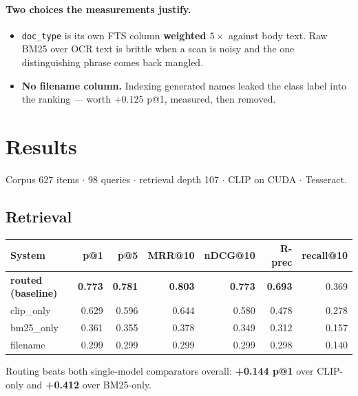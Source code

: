 \documentclass[11pt,a4paper]{article}
\newcommand{\code}[1]{\texttt{\small #1}}
\newcommand{\best}[1]{\textbf{#1}}
\begin{document}
\paragraph{Two choices the measurements justify.}
\begin{itemize}[leftmargin=1.3em,itemsep=0.2em]
  \item \code{doc\_type} is its own FTS column \textbf{weighted $5\times$} against
        body text. Raw BM25 over OCR text is brittle when a scan is noisy and the
        one distinguishing phrase comes back mangled.
  \item \textbf{No filename column.} Indexing generated names leaked the class
        label into the ranking --- worth $+0.125$ p@1, measured, then removed.
\end{itemize}

\section{Results}

Corpus 627 items $\cdot$ 98 queries $\cdot$ retrieval depth 107 $\cdot$ CLIP on
CUDA $\cdot$ Tesseract.

\subsection{Retrieval}

\begin{center}
\begin{tabular}{@{}lrrrrrr@{}}
\toprule
\textbf{System} & \textbf{p@1} & \textbf{p@5} & \textbf{MRR@10} & \textbf{nDCG@10}
  & \textbf{R-prec} & \textbf{recall@10} \\
\midrule
\textbf{routed (baseline)} & \best{0.773} & \best{0.781} & \best{0.803} & \best{0.773} & \best{0.693} & 0.369 \\
clip\_only  & 0.629 & 0.596 & 0.644 & 0.580 & 0.478 & 0.278 \\
bm25\_only  & 0.361 & 0.355 & 0.378 & 0.349 & 0.312 & 0.157 \\
filename    & 0.299 & 0.299 & 0.299 & 0.299 & 0.298 & 0.140 \\
\bottomrule
\end{tabular}
\end{center}

Routing beats both single-model comparators overall: \textbf{+0.144 p@1} over
CLIP-only and \textbf{+0.412} over BM25-only.
\end{document}
